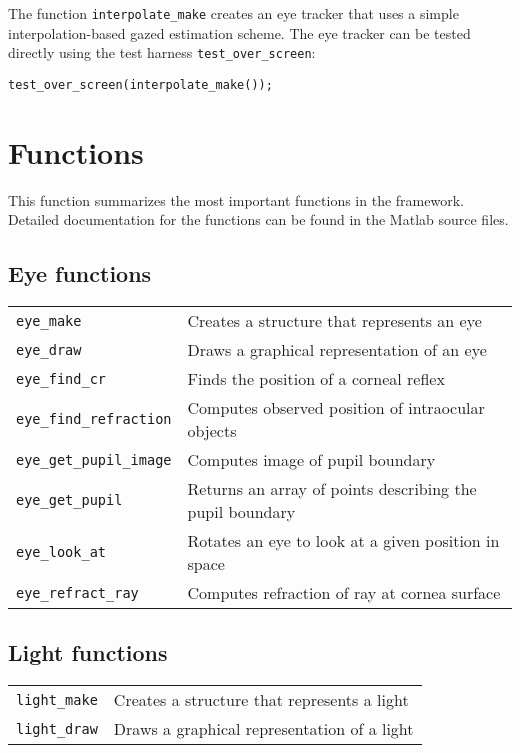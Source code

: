 \documentclass{scrartcl}
\begin{document}
The function \texttt{interpolate\_make} creates an eye tracker that uses a
simple interpolation-based gazed estimation scheme. The eye tracker can be
tested directly using the test harness \texttt{test\_over\_screen}:

\begin{verbatim}
test_over_screen(interpolate_make());
\end{verbatim}

\section{Functions}

This function summarizes the most important functions in the framework.
Detailed documentation for the functions can be found in the Matlab source
files.

\subsection*{Eye functions}

\begin{longtable}{p{4cm}p{9.2cm}}
\texttt{eye\_make} & Creates a structure that represents an eye \\
\texttt{eye\_draw} & Draws a graphical representation of an eye \\
\texttt{eye\_find\_cr} & Finds the position of a corneal reflex \\
\texttt{eye\_find\_refraction} & Computes observed position of intraocular
    objects \\
\texttt{eye\_get\_pupil\_image} & Computes image of pupil boundary \\
\texttt{eye\_get\_pupil} & Returns an array of points describing the pupil
    boundary \\
\texttt{eye\_look\_at} & Rotates an eye to look at a given position in 
    space \\
\texttt{eye\_refract\_ray} & Computes refraction of ray at cornea surface
\end{longtable}

\subsection*{Light functions}

\begin{longtable}{p{4cm}p{9.2cm}}
\texttt{light\_make} & Creates a structure that represents a light \\
\texttt{light\_draw} & Draws a graphical representation of a light
\end{longtable}
\end{document}
